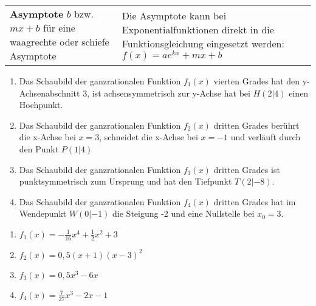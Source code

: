 \begin{tabular}{p{}|p{}}
	\hline
	\textbf{Asymptote} \(b\) bzw.\newline\(mx+b\) für eine waagrechte oder schiefe Asymptote&\textcolor{loes}{Die Asymptote kann bei Exponentialfunktionen direkt in die Funktionsgleichung eingesetzt werden: \(f(x)=ae^{kx}+mx+b\)}\newline\newline\newline\newline
\end{tabular}
\newpage
\begin{Exercise}[title={\raggedright Bestimme jeweils die Funktionsgleichung.}, label=fktbestimmenA1]
	\begin{enumerate}[label=\alph*)]
		\item Das Schaubild der ganzrationalen Funktion \(f_1(x)\) vierten Grades hat den y-Achsenabschnitt 3, ist achsensymmetrisch zur y-Achse hat bei \(H(2|4)\) einen Hochpunkt.
		\item Das Schaubild der ganzrationalen Funktion \(f_2(x)\) dritten Grades berührt die x-Achse bei \(x=3\), schneidet die x-Achse bei \(x=-1\) und verläuft durch den Punkt \(P(1|4)\)
		\item Das Schaubild der ganzrationalen Funktion \(f_3(x)\) dritten Grades ist punktsymmetrisch zum Ursprung und hat den Tiefpunkt \(T(2|-8)\).
		\item Das Schaubild der ganzrationalen Funktion \(f_4(x)\) dritten Grades hat im Wendepunkt \newline\(W(0|-1)\) die Steigung -2 und eine Nullstelle bei \(x_0=3\).
	\end{enumerate}
\end{Exercise}
\begin{Answer}[ref=fktbestimmenA1]
	\begin{enumerate}[label=\alph*)]
		\item \(f_1(x)=-\frac{1}{16}x^4+\frac{1}{2}x^2+3\)
		\item \(f_2(x)=0,5(x+1)(x-3)^2\)
		\item \(f_3(x)=0,5x^3-6x\)
		\item \(f_4(x)=\frac{7}{27}x^3-2x-1\)
	\end{enumerate}
\end{Answer}

